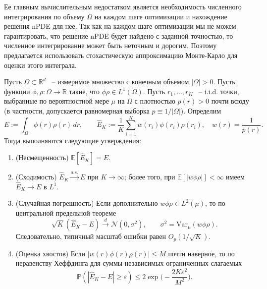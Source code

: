 \documentclass[a4paper,14pt,oneside,openany]{extarticle}
\begin{document}
Ее главным вычислительным недостатком является необходимость численного интегрирования 
по объему $\Omega$ на каждом шаге оптимизации и нахождение решения nPDE для нее. 
Так как на каждом шаге оптимизации мы не можем гарантировать, что решение nPDE будет
 найдено с заданной точностью, то численное интегрирование может быть неточным 
 и дорогим. Поэтому предлагается использовать стохастическую аппроксимацию Монте-Карло для оценки этого интеграла.

\begin{lemma}
Пусть $\Omega\subset\mathbb{R}^d$ ~-- измеримое множество с конечным объемом $|\Omega|>0$.
Пусть функции $\phi,\rho:\Omega\to\mathbb{R}$ такие, что $\phi\rho\in L^1(\Omega)$. 
Пусть $r_1,\dots,r_K$ ~-- i.i.d. точки, выбранные по вероятностной мере $\mu$ на 
$\Omega$ с плотностью $p(r)>0$ почти всюду (в частности, допускается равномерная 
выборка $p\equiv1/|\Omega|$).
Определим
\[ E := \int_{\Omega}\phi(r)\rho(r)\,dr,\qquad \hat E_K := \frac{1}{K}\sum_{i=1}^K w(r_i)\phi(r_i)\rho(r_i),\quad w(r) = \frac{1}{p(r)}.\]
Тогда выполняются следующие утверждения:
\begin{enumerate}
\item (Несмещенность) $\mathbb{E}[\hat E_K]=E$.
\item (Сходимость) $\hat E_K\xrightarrow{a.s.}E$ при $K\to\infty$; более того, при $\mathbb{E}[|w\phi\rho|]<\infty$ имеем $\hat E_K\to E$ в $L^1$.
\item (Случайная погрешность) Если дополнительно $w\phi\rho\in L^2(\mu)$, то по центральной предельной теореме
\[ \sqrt{K}(\hat E_K-E)\xrightarrow{d}\mathcal{N}(0,\sigma^2),\qquad \sigma^2=\mathrm{Var}_\mu(w\phi\rho). \]
Следовательно, типичный масштаб ошибки равен $O_p(1/\sqrt{K})$.
\item (Оценка хвостов) Если $|w(r)\phi(r)\rho(r)|\le M$ почти наверное, то по неравенству Хеффдинга для суммы независимых ограниченных слагаемых
\[ \mathbb{P}(|\hat E_K-E|\ge\varepsilon)\le 2\exp\Big(-\frac{2K\varepsilon^2}{M^2}\Big). \]
\end{enumerate}
\end{lemma}
\end{document}
